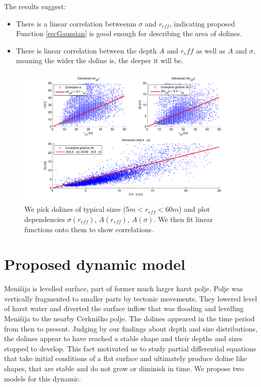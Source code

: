 \documentclass[a0,portrait]{a0poster}
\begin{document}
\begin{multicols}{2}
The results suggest:
\begin{itemize}
	\item There is a linear correlation betweenm $\sigma$ and $r_{eff}$, indicating proposed Function \ref{eq:Gaussian} is good enough for describing the area of dolines.
	\item There is linear correlation between the depth $A$ and $r_eff$ as well as $A$ and $\sigma$, meaning the wider the doline is, the deeper it will be.
\end{itemize}

\vspace{0.5cm}
  \begin{figure}[H]
    \centering
    \includegraphics[width=0.85\linewidth]{menisija-A-sigma-reff.pdf}
    \caption{We pick dolines of typical sizes ($5m < r_{eff} < 60m$) and plot dependencies $\sigma(r_{eff})$, $A(r_{eff})$, $A(\sigma)$. We then fit linear functions onto them to show correlations.}
    \label{fig:vrtace-fit}
  \end{figure}


\section*{Proposed dynamic model}

Menišija is levelled surface, part of former much larger karst polje. Polje was vertically fragmented to smaller parts by tectonic movements. They lowered level of karst water and diverted the surface inflow that was flooding and levelling Menišija to the nearby Cerkniško polje. The dolines appeared in the time period from then to present. Judging by our findings about depth and size distributions, the dolines appear to have reached a stable shape and their depths and sizes stopped to develop.
This fact motivated us to study partial differential equations that take initial conditions of a flat surface and ultimately produce doline like shapes, that are stable and do not grow or diminish in time. We propose two models for this dynamic.


\end{multicols}
\end{document}
